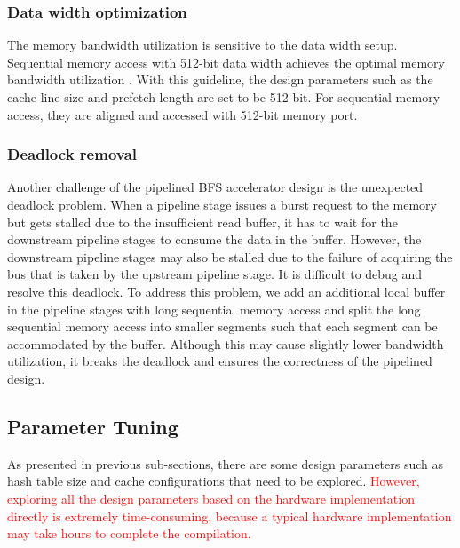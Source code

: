 \subsubsection{Data width optimization}
The memory bandwidth utilization is sensitive to the data width setup. 
Sequential memory access with 512-bit data width achieves the optimal 
memory bandwidth utilization \cite{kalms2017exploration}.  
With this guideline, the design parameters such as the cache line size 
and prefetch length are set to be 512-bit. For sequential 
memory access, they are aligned and accessed with 512-bit memory port.


\subsubsection{Deadlock removal}
Another challenge of the pipelined BFS accelerator design is the 
unexpected deadlock problem. 
When a pipeline stage issues a burst request to the memory 
but gets stalled due to the insufficient read buffer, it has to 
wait for the downstream pipeline stages to consume the data in the buffer. 
However, the downstream pipeline stages may also be stalled due to 
the failure of acquiring the bus that is taken by the upstream pipeline stage.
It is difficult to debug and resolve this deadlock. To address this problem, we
add an additional local buffer in the pipeline stages with long sequential 
memory access and split the long sequential memory access into smaller 
segments such that each segment can be accommodated by the buffer. 
Although this may cause slightly lower bandwidth utilization, it breaks the deadlock and 
ensures the correctness of the pipelined design.

\subsection{Parameter Tuning}
As presented in previous sub-sections, there are some design 
parameters such as hash table size and cache configurations
that need to be explored. \textcolor{red}{However, exploring all the design parameters 
based on the hardware implementation directly is extremely time-consuming, 
because a typical hardware implementation may take hours to complete the compilation.}


